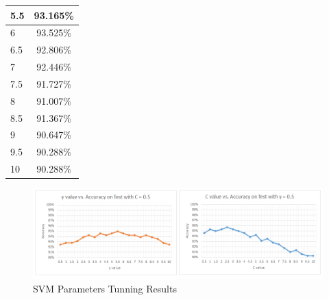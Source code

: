 \documentclass[a4paper,10pt,english]{article}
\begin{document}
\begin{minipage}{\textwidth}
\begin{minipage}[b]{0.49\textwidth}
\begin{tabular}{|l|c|}
                    5.5                              & 93.165\%                               \\ \hline
                    6                                & 93.525\%                               \\ \hline
                    6.5                              & 92.806\%                               \\ \hline
                    7                                & 92.446\%                               \\ \hline
                    7.5                              & 91.727\%                               \\ \hline
                    8                                & 91.007\%                               \\ \hline
                    8.5                              & 91.367\%                               \\ \hline
                    9                                & 90.647\%                               \\ \hline
                    9.5                              & 90.288\%                               \\ \hline
                    10                               & 90.288\%                               \\ \hline
                \end{tabular}
            \label{tab:results_c}
        \end{minipage}
    \end{minipage}
    
    \vspace{30pt}
    
    \begin{figure}[h!]
        \centering
        \includegraphics[width=500pt]{images/results_svm_parameters}
        \caption{SVM Parameters Tunning Results} \label{fig:results_svm_parameters}
    \end{figure}
\end{document}
